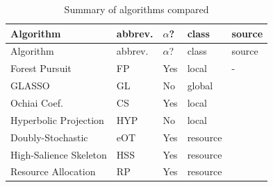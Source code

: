 \documentclass[%
	12pt,
		oneside,
		letterpaper
]{book}
\begin{document}
\begin{longtable}[]{@{}
  >{\raggedright\arraybackslash}p{}
  >{\centering\arraybackslash}p{}
  >{\centering\arraybackslash}p{}
  >{\centering\arraybackslash}p{}
  >{\raggedleft\arraybackslash}p{}@{}}
\caption{Summary of algorithms compared}\label{tbl-methods}\tabularnewline
\toprule\noalign{}
\begin{minipage}[b]{\linewidth}\raggedright
Algorithm
\end{minipage} & \begin{minipage}[b]{\linewidth}\centering
abbrev.
\end{minipage} & \begin{minipage}[b]{\linewidth}\centering
\(\alpha\)?
\end{minipage} & \begin{minipage}[b]{\linewidth}\centering
class
\end{minipage} & \begin{minipage}[b]{\linewidth}\raggedleft
source
\end{minipage} \\
\midrule\noalign{}
\endfirsthead
\toprule\noalign{}
\begin{minipage}[b]{\linewidth}\raggedright
Algorithm
\end{minipage} & \begin{minipage}[b]{\linewidth}\centering
abbrev.
\end{minipage} & \begin{minipage}[b]{\linewidth}\centering
\(\alpha\)?
\end{minipage} & \begin{minipage}[b]{\linewidth}\centering
class
\end{minipage} & \begin{minipage}[b]{\linewidth}\raggedleft
source
\end{minipage} \\
\midrule\noalign{}
\endhead
\bottomrule\noalign{}
\endlastfoot
Forest Pursuit & FP & Yes & local & - \\
GLASSO & GL & No & global & \autocite{Sparseinversecovariance_Friedman2008,Structureestimationdiscrete_Loh2012} \\
Ochiai Coef. & CS & Yes & local & \autocite{Measuresecologicalassociation_Janson1981} \\
Hyperbolic Projection & HYP & No & local & \autocite{Scientificcollaborationnetworks._Newman2001} \\
Doubly-Stochastic & eOT & Yes & resource & \autocite{twostagealgorithm_Slater2009,Sinkhorndistanceslightspeed_Cuturi2013} \\
High-Salience Skeleton & HSS & Yes & resource & \autocite{Robustclassificationsalient_Grady2012} \\
Resource Allocation & RP & Yes & resource & \autocite{Bipartitenetworkprojection_Zhou2007} \\
\end{longtable}
\end{document}
